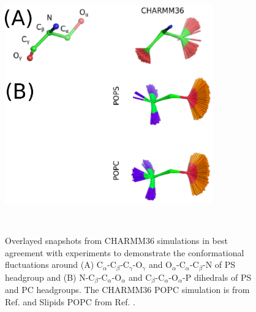 \documentclass[aps,prl,superscriptaddress,twocolumn]{revtex4}
\begin{document}
\begin{figure}[]
  \centering
  \includegraphics[width=9.0cm]{../Figs/structures.eps}
  \caption{\label{HGstructuresPSandPC}
    Overlayed snapshots from CHARMM36 simulations in best agreement with experiments
    to demonstrate the conformational fluctuations around
    (A) C$_\alpha$-C$_\beta$-C$_\gamma$-O$_\gamma$ and  O$_\alpha$-C$_\alpha$-C$_\beta$-N
    of PS headgroup and (B) N-C$_\beta$-C$_\alpha$-O$_\alpha$ and C$_\beta$-C$_\alpha$-O$_\alpha$-P
    dihedrals of PS and PC headgroups.
    The CHARMM36 POPC simulation is from Ref.  and Slipids POPC from Ref. .
  }
   \\
\end{figure}
\end{document}
